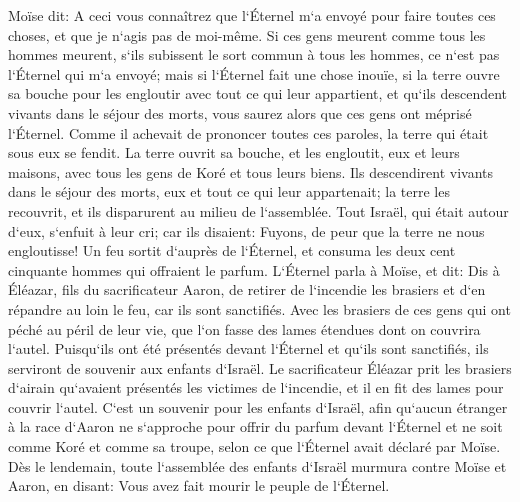 \verse Moïse dit: A ceci vous connaîtrez que l`Éternel m`a envoyé pour faire toutes ces choses, et que je n`agis pas de moi-même. 
\verse Si ces gens meurent comme tous les hommes meurent, s`ils subissent le sort commun à tous les hommes, ce n`est pas l`Éternel qui m`a envoyé; 
\verse mais si l`Éternel fait une chose inouïe, si la terre ouvre sa bouche pour les engloutir avec tout ce qui leur appartient, et qu`ils descendent vivants dans le séjour des morts, vous saurez alors que ces gens ont méprisé l`Éternel. 
\verse Comme il achevait de prononcer toutes ces paroles, la terre qui était sous eux se fendit. 
\verse La terre ouvrit sa bouche, et les engloutit, eux et leurs maisons, avec tous les gens de Koré et tous leurs biens. 
\verse Ils descendirent vivants dans le séjour des morts, eux et tout ce qui leur appartenait; la terre les recouvrit, et ils disparurent au milieu de l`assemblée. 
\verse Tout Israël, qui était autour d`eux, s`enfuit à leur cri; car ils disaient: Fuyons, de peur que la terre ne nous engloutisse! 
\verse Un feu sortit d`auprès de l`Éternel, et consuma les deux cent cinquante hommes qui offraient le parfum. 
\verse L`Éternel parla à Moïse, et dit: 
\verse Dis à Éléazar, fils du sacrificateur Aaron, de retirer de l`incendie les brasiers et d`en répandre au loin le feu, car ils sont sanctifiés. 
\verse Avec les brasiers de ces gens qui ont péché au péril de leur vie, que l`on fasse des lames étendues dont on couvrira l`autel. Puisqu`ils ont été présentés devant l`Éternel et qu`ils sont sanctifiés, ils serviront de souvenir aux enfants d`Israël. 
\verse Le sacrificateur Éléazar prit les brasiers d`airain qu`avaient présentés les victimes de l`incendie, et il en fit des lames pour couvrir l`autel. 
\verse C`est un souvenir pour les enfants d`Israël, afin qu`aucun étranger à la race d`Aaron ne s`approche pour offrir du parfum devant l`Éternel et ne soit comme Koré et comme sa troupe, selon ce que l`Éternel avait déclaré par Moïse. 
\verse Dès le lendemain, toute l`assemblée des enfants d`Israël murmura contre Moïse et Aaron, en disant: Vous avez fait mourir le peuple de l`Éternel. 
